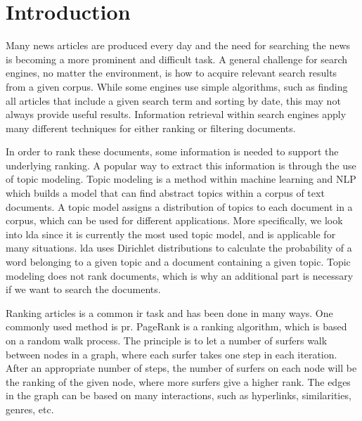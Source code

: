 \section{Introduction} 


Many news articles are produced every day and the need for searching the news is becoming a more prominent and difficult task.
A general challenge for search engines, no matter the environment, is how to acquire relevant search results from a given corpus. 
While some engines use simple algorithms, such as finding all articles that include a given search term and sorting by date, this may not always provide useful results.
Information retrieval within search engines apply many different techniques for either ranking or filtering documents\cite{google_pagerank2006}.

In order to rank these documents, some information is needed to support the underlying ranking.
A popular way to extract this information is through the use of topic modeling.
Topic modeling is a method within machine learning and \gls{NLP} which builds a model that can find abstract topics within a corpus of text documents.
A topic model assigns a distribution of topics to each document in a corpus, which can be used for different applications.
More specifically, we look into \gls{lda} since it is currently the most used topic model, and is applicable for many situations\cite{lda}.
\gls{lda} uses Dirichlet distributions to calculate the probability of a word belonging to a given topic and a document containing a given topic.
Topic modeling does not rank documents, which is why an additional part is necessary if we want to search the documents.

Ranking articles is a common \gls{ir} task and has been done in many ways.
One commonly used method is \gls{pr}\cite{google_pagerank2006}.
PageRank\cite{pagerank_1999} is a ranking algorithm, which is based on a random walk process.
The principle is to let a number of surfers walk between nodes in a graph, where each surfer takes one step in each iteration.
After an appropriate number of steps, the number of surfers on each node will be the ranking of the given node, where more surfers give a higher rank.
The edges in the graph can be based on many interactions, such as hyperlinks, similarities, genres, etc.

